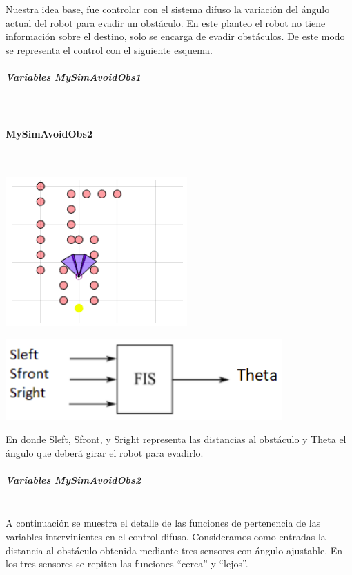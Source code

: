 Nuestra idea base, fue controlar con el sistema difuso la variación del ángulo actual del robot para evadir un obstáculo. En este planteo el robot no tiene información sobre el destino, solo se encarga de evadir obstáculos. De este modo se representa el control con el siguiente esquema.

\subparagraph{Variables MySimAvoidObs1}\mbox{}\\


\paragraph{MySimAvoidObs2}\mbox{}\\

\begin{center}
    \includegraphics[scale=0.5]{Tesis/Capitulos/04_CAPITULO_2/img/des1.png}
\end{center}

\begin{center}
    \includegraphics[scale=0.5]{Tesis/Capitulos/04_CAPITULO_2/img/esquema1.png}
\end{center}

En donde Sleft, Sfront, y Sright representa las distancias al obstáculo y Theta el ángulo que deberá girar el robot para evadirlo.

\subparagraph{Variables MySimAvoidObs2}\mbox{}\\

A continuación se muestra el detalle de las funciones de pertenencia de las variables intervinientes en el control difuso. Consideramos como entradas la distancia al obstáculo obtenida mediante tres sensores con ángulo ajustable. En los tres sensores se repiten las funciones “cerca” y “lejos”.